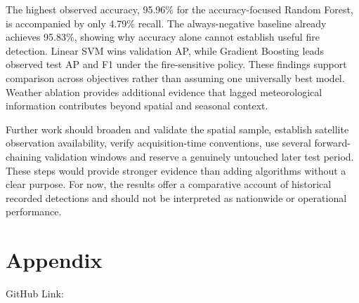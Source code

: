 \documentclass[conference,a4paper]{IEEEtran}
\begin{document}
The highest observed accuracy, 95.96\% for the accuracy-focused Random Forest, is accompanied by only 4.79\% recall. The always-negative baseline already achieves 95.83\%, showing why accuracy alone cannot establish useful fire detection. Linear SVM wins validation AP, while Gradient Boosting leads observed test AP and F1 under the fire-sensitive policy. These findings support comparison across objectives rather than assuming one universally best model. Weather ablation provides additional evidence that lagged meteorological information contributes beyond spatial and seasonal context.

Further work should broaden and validate the spatial sample, establish satellite observation availability, verify acquisition-time conventions, use several forward-chaining validation windows and reserve a genuinely untouched later test period. These steps would provide stronger evidence than adding algorithms without a clear purpose. For now, the results offer a comparative account of historical recorded detections and should not be interpreted as nationwide or operational performance.


\section*{Appendix}
\noindent GitHub Link:
\end{document}
